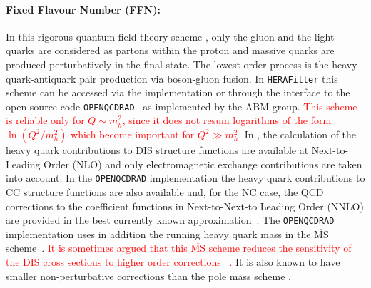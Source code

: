\paragraph{Fixed Flavour Number (FFN)\rm:\\} 
In this rigorous quantum field theory scheme \cite{Laenen:1992, Laenen:1993, Riem:1995}, 
only the gluon and the light quarks are considered
as partons within the proton and massive 
quarks are produced perturbatively in the final state.
The lowest order process is
the heavy quark-antiquark pair production via boson-gluon fusion.
In \texttt{HERA}\texttt{Fitter} this scheme can be accessed via the 
\qcdnum implementation or through the interface to the open-source code \texttt{OPENQCDRAD}~\cite{openqcdrad:page} as implemented by the ABM group.
\textcolor{red}{
This scheme is reliable only for $Q\sim m_h^2$, since it does not resum logarithms of the 
form $\ln(Q^2/m_h^2)$ which become important for $Q^2\gg m_h^2$.
}
In \qcdnum, the calculation of the heavy quark contributions to DIS structure functions
are available at Next-to-Leading Order (NLO) and only electromagnetic exchange contributions are taken into account. 
In the \texttt{OPEN}\texttt{QCDRAD} implementation the heavy quark contributions to CC structure functions are also available 
and, for the NC case, the QCD corrections to the coefficient functions in Next-to-Next-to Leading Order (NNLO)
are provided in the best currently known approximation~\cite{SMoch:npb864,Bierenbaum:2009mv}.
The  \texttt{OPENQCDRAD} implementation uses in addition the running heavy quark mass in the $\overline{\text{MS}}$ scheme~\cite{Alekhin:runm}.
\textcolor{red}{
It is sometimes argued that this $\overline{\text{MS}}$ scheme reduces the sensitivity of the DIS cross sections to higher order 
corrections ~\cite{Alekhin:runm}. 
}
It is also known to have smaller non-perturbative corrections than the pole mass scheme \cite{Beneke:1998ui}.

